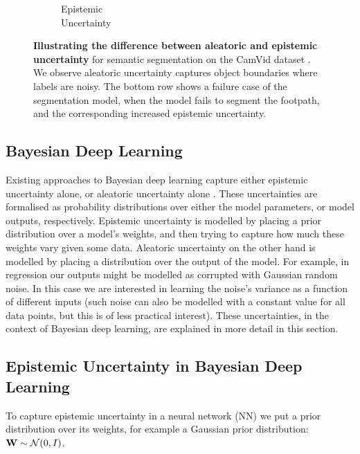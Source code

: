 \begin{figure}[t]
{\begin{subfigure}[t]{0.22\linewidth}
        \caption{Epistemic\\Uncertainty}

\end{subfigure}}
\caption[Comparing different types of uncertainty in deep learning.]{\textbf{Illustrating the difference between aleatoric and epistemic uncertainty} for semantic segmentation on the CamVid dataset \citep{brostow2009semantic}. We observe aleatoric uncertainty captures object boundaries where labels are noisy. The bottom row shows a failure case of the segmentation model, when the model fails to segment the footpath, and the corresponding increased epistemic uncertainty.}
\label{fig:camvid_qual}
\end{figure}

\subsection{Bayesian Deep Learning}
\label{related_work}

Existing approaches to Bayesian deep learning capture either epistemic uncertainty alone, or aleatoric uncertainty alone \citep{gal2016thesis}. These uncertainties are formalised as probability distributions over either the model parameters, or model outputs, respectively. Epistemic uncertainty is modelled by placing a prior distribution over a model's weights, and then trying to capture how much these weights vary given some data. Aleatoric uncertainty on the other hand is modelled by placing a distribution over the output of the model. For example, in regression our outputs might be modelled as corrupted with Gaussian random noise. In this case we are interested in learning the noise's variance as a function of different inputs (such noise can also be modelled with a constant value for all data points, but this is of less practical interest). These uncertainties, in the context of Bayesian deep learning, are explained in more detail in this section. 

\subsection{Epistemic Uncertainty in Bayesian Deep Learning}
\label{sect:dropout_VI}

To capture epistemic uncertainty in a neural network (NN) we put a prior distribution over its weights, for example a Gaussian prior distribution:
$\mathbf{W} \sim \mathcal{N}(0, I)$.

